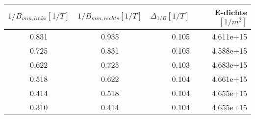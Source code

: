 \begin{tabular}{ccrr}
\toprule
 $1/B_{min, links}[1/\si{T}] $&  $1/B_{min, rechts}[1/\si{T}] $ & $ \Delta_{1/B}[1/\si{T}]$ &  E-dichte $[1/\si{m}^2]$\\
\midrule
       0.831 &         0.935 &         0.105 &  4.611e+15 \\
       0.725 &         0.831 &         0.105 &  4.588e+15 \\
       0.622 &         0.725 &         0.103 &  4.683e+15 \\
       0.518 &         0.622 &         0.104 &  4.661e+15 \\
       0.414 &         0.518 &         0.104 &  4.655e+15 \\
       0.310 &         0.414 &         0.104 &  4.655e+15 \\
\bottomrule
\end{tabular}
